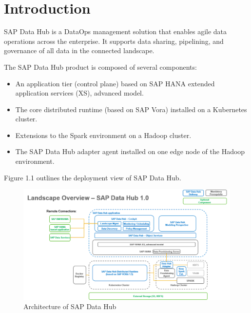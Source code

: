 \documentclass[article,colorback,accentcolor=tud4c]{tudreport}
\begin{document}
\tableofcontents
\newpage

\section{Introduction}
\setcounter{table}{0}
\setcounter{figure}{0}

SAP Data Hub is a DataOps management solution that enables agile data operations across the enterprise. It supports data sharing, pipelining, and governance of all data in the connected landscape.\cite{sap data hub}

The SAP Data Hub product is composed of several components\cite{data hub architecture}:
\begin{itemize}\itemsep-\the\parsep
\item An application tier (control plane) based on SAP HANA extended application services (XS), advanced model.
\item The core distributed runtime (based on SAP Vora) installed on a Kubernetes cluster.
\item Extensions to the Spark environment on a Hadoop cluster.
\item The SAP Data Hub adapter agent installed on one edge node of the Hadoop environment.
\end{itemize}

Figure 1.1 outlines the deployment view of SAP Data Hub.

\begin{figure}[!h]
   	\centering
   	\includegraphics[width=\textwidth]{architecture}
   	\caption{Architecture of SAP Data Hub\cite{data hub architecture}}
\end{figure}
\end{document}
